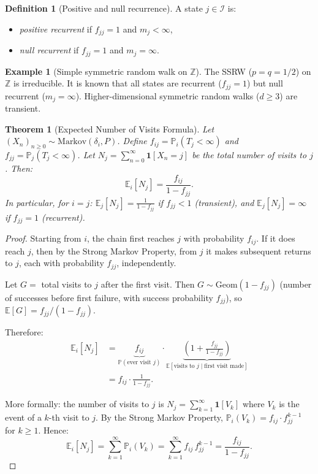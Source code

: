 \documentclass[12pt, a4paper]{article}
\theoremstyle{definition}
\newtheorem{definition}{Definition}[section]
\newtheorem{example}{Example}[section]
\theoremstyle{plain}
\newtheorem{theorem}{Theorem}[section]
\newcommand{\PP}{\mathbb{P}}
\newcommand{\EE}{\mathbb{E}}
\newcommand{\II}{\mathcal{I}}
\begin{document}
\begin{definition}[Positive and null recurrence]
A state $j \in \II$ is:
\begin{itemize}
  \item \emph{positive recurrent} if $f_{jj} = 1$ and $m_j < \infty$,
  \item \emph{null recurrent} if $f_{jj} = 1$ and $m_j = \infty$.
\end{itemize}
\end{definition}

\begin{example}[Simple symmetric random walk on $\mathbb{Z}$]
The SSRW ($p = q = 1/2$) on $\mathbb{Z}$ is irreducible. It is known that all states are recurrent ($f_{jj}=1$) but null recurrent ($m_j = \infty$). Higher-dimensional symmetric random walks ($d \ge 3$) are transient.
\end{example}

\begin{theorem}[Expected Number of Visits Formula]
\label{thm:ENj}
Let $(X_n)_{n\ge 0} \sim \text{Markov}(\delta_i, P)$. Define $f_{ij} = \PP_i(T_j < \infty)$ and $f_{jj} = \PP_j(T_j < \infty)$. Let $N_j = \sum_{n=0}^\infty \mathbf{1}[X_n = j]$ be the total number of visits to $j$. Then:
\[
  \EE_i[N_j] = \frac{f_{ij}}{1 - f_{jj}}.
\]
In particular, for $i = j$: $\EE_j[N_j] = \frac{1}{1-f_{jj}}$ if $f_{jj} < 1$ (transient), and $\EE_j[N_j] = \infty$ if $f_{jj} = 1$ (recurrent).
\end{theorem}

\begin{proof}
Starting from $i$, the chain first reaches $j$ with probability $f_{ij}$. If it does reach $j$, then by the Strong Markov Property, from $j$ it makes subsequent returns to $j$, each with probability $f_{jj}$, independently.

Let $G = $ total visits to $j$ after the first visit. Then $G \sim \text{Geom}(1-f_{jj})$ (number of successes before first failure, with success probability $f_{jj}$), so $\EE[G] = f_{jj}/(1-f_{jj})$.

Therefore:
\begin{align*}
  \EE_i[N_j] &= \underbrace{f_{ij}}_{\PP(\text{ever visit }j)} \cdot \underbrace{\left(1 + \frac{f_{jj}}{1-f_{jj}}\right)}_{\EE[\text{visits to }j \mid \text{first visit made}]} \\[4pt]
  &= f_{ij} \cdot \frac{1}{1-f_{jj}}.
\end{align*}

More formally: the number of visits to $j$ is $N_j = \sum_{k=1}^\infty \mathbf{1}[V_k]$ where $V_k$ is the event of a $k$-th visit to $j$. By the Strong Markov Property, $\PP_i(V_k) = f_{ij} \cdot f_{jj}^{k-1}$ for $k \ge 1$. Hence:
\[
  \EE_i[N_j] = \sum_{k=1}^\infty \PP_i(V_k) = \sum_{k=1}^\infty f_{ij}\, f_{jj}^{k-1} = \frac{f_{ij}}{1 - f_{jj}}.
\]
\end{proof}
\end{document}

